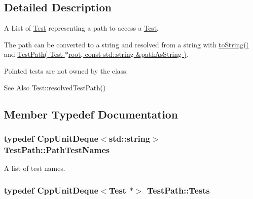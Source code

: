 \subsection{Detailed Description}
A List of \hyperlink{class_test}{Test} representing a path to access a \hyperlink{class_test}{Test}.

The path can be converted to a string and resolved from a string with \hyperlink{class_test_path_a75ec4a351f0734cefbf449325d7442ee}{to\-String()} and \hyperlink{class_test_path_a5855701e39a328a19f9780a130106cb3}{Test\-Path( Test $\ast$root, const std\-::string \&path\-As\-String )}. 

Pointed tests are not owned by the class.

\begin{DoxySeeAlso}{See Also}
Test\-::resolved\-Test\-Path() 
\end{DoxySeeAlso}


\subsection{Member Typedef Documentation}
\hypertarget{class_test_path_a525c33f5b897710bf37cf593160e562a}{
\subsubsection[{Path\-Test\-Names}]{\setlength{\rightskip}{0pt plus 5cm}typedef {\bf Cpp\-Unit\-Deque}$<${\bf std\-::string}$>$ {\bf Test\-Path\-::\-Path\-Test\-Names}\hspace{0.3cm}{\ttfamily [protected]}}}\label{class_test_path_a525c33f5b897710bf37cf593160e562a}


A list of test names. 

\hypertarget{class_test_path_aa1f2a0a7e01597a16ed041776297fbdf}{
\subsubsection[{Tests}]{\setlength{\rightskip}{0pt plus 5cm}typedef {\bf Cpp\-Unit\-Deque}$<${\bf Test} $\ast$$>$ {\bf Test\-Path\-::\-Tests}\hspace{0.3cm}{\ttfamily [protected]}}}\label{class_test_path_aa1f2a0a7e01597a16ed041776297fbdf}


